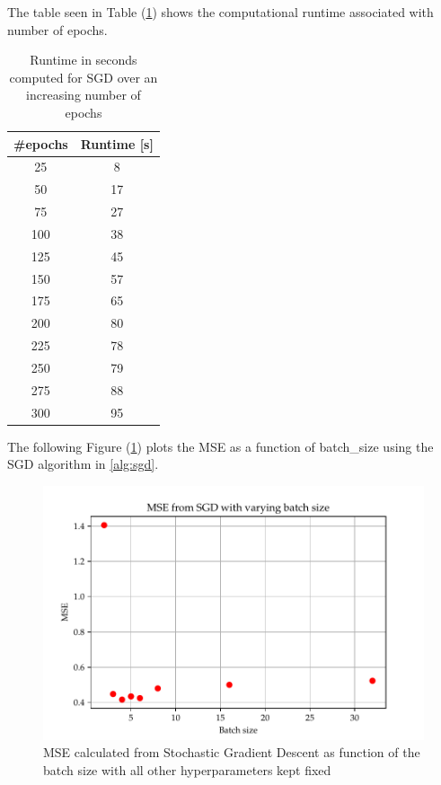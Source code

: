 \documentclass
[twocolumn,
secnumarabic,
nobibnotes,
aps,
prl,
reprint,
groupedaddress,
amsmath,
amssymb
]{revtex4-2}
\begin{document}
The table seen in Table (\ref{tab:a_epoch_run}) shows the computational runtime associated with number of epochs.

\begin{table}
  \caption{\label{tab:a_epoch_run}Runtime in seconds computed for SGD over an increasing number of epochs}
  \begin{tabular}{|c|c|}
    \hline
    \#epochs & Runtime [s] \\ \hline
    25       & 8           \\
    50       & 17          \\
    75       & 27          \\
    100      & 38          \\
    125      & 45          \\
    150      & 57          \\
    175      & 65          \\
    200      & 80          \\
    225      & 78          \\
    250      & 79          \\
    275      & 88          \\
    300      & 95          \\
    \hline
  \end{tabular}
\end{table}

The following Figure (\ref{fig:a_bs}) plots the MSE as a function of batch\_size using the SGD algorithm in \ref{alg:sgd}.

\begin{figure}
  \includegraphics[width=\columnwidth]{figures/EX_A_mse_with_varying_batch_size.pdf}
  \caption{\label{fig:a_bs}MSE calculated from Stochastic Gradient Descent as function of the batch size with all other hyperparameters kept fixed}
\end{figure}
\end{document}

